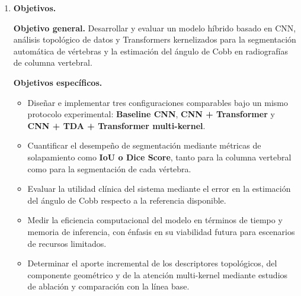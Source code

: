 \documentclass[8pt,a4paper]{article}
\newcommand{\Subtitulo}[1]{\vspace{0.15cm}\textbf{#1}}
\begin{document}
\begin{enumerate}[leftmargin=0.8cm,label=\arabic*.,itemsep=0.85em]
    Formalmente, dada una radiografía \(I:\Omega\rightarrow\mathbb{R}\), con \(\Omega\subset\mathbb{R}^2\), se busca estimar:
    \[
    f_{\theta}: I \rightarrow Y,
    \]
    donde \(Y:\Omega\rightarrow\{0,1,\dots,C-1\}\) representa una máscara multiclase por vértebra. El problema de aprendizaje se plantea como:
    \[
    \theta^{*}=\arg\min_{\theta}\;\mathbb{E}_{(I,Y)\sim\mathcal{D}}\left[\mathcal{L}(f_{\theta}(I),Y)\right].
    \]

    \Subtitulo{c) Justificación e impacto esperado.} Se propone un modelo híbrido \textbf{CNN + TDA + Transformer multi-kernel} para mejorar la coherencia anatómica de la segmentación y facilitar la estimación automática del ángulo de Cobb. El impacto esperado incluye: i) reducción de la variabilidad en la medición radiológica; ii) aumento de la reproducibilidad en el seguimiento clínico; iii) disminución del tiempo de análisis manual; y iv) habilitación futura de herramientas portables o desplegables en entornos con restricciones de cómputo, manteniendo al sistema como soporte a la decisión clínica y no como sustituto del especialista.

    \item \textbf{Objetivos.}

    \textbf{Objetivo general.} Desarrollar y evaluar un modelo híbrido basado en CNN, análisis topológico de datos y Transformers kernelizados para la segmentación automática de vértebras y la estimación del ángulo de Cobb en radiografías de columna vertebral.

    \textbf{Objetivos específicos.}
    \begin{itemize}[leftmargin=0.6cm,itemsep=0.25em]
        \item Diseñar e implementar tres configuraciones comparables bajo un mismo protocolo experimental: \textbf{Baseline CNN}, \textbf{CNN + Transformer} y \textbf{CNN + TDA + Transformer multi-kernel}.
        \item Cuantificar el desempeño de segmentación mediante métricas de solapamiento como \textbf{IoU o Dice Score}, tanto para la columna vertebral como para la segmentación de cada vértebra.
        \item Evaluar la utilidad clínica del sistema mediante el error en la estimación del ángulo de Cobb respecto a la referencia disponible.
        \item Medir la eficiencia computacional del modelo en términos de tiempo y memoria de inferencia, con énfasis en su viabilidad futura para escenarios de recursos limitados.
        \item Determinar el aporte incremental de los descriptores topológicos, del componente geométrico y de la atención multi-kernel mediante estudios de ablación y comparación con la línea base.
    \end{itemize}


\end{enumerate}
\end{document}
